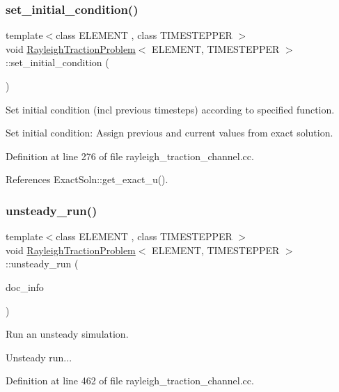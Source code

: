 \subsubsection{\texorpdfstring{set\+\_\+initial\+\_\+condition()}{set\_initial\_condition()}}
{\footnotesize\ttfamily template$<$class E\+L\+E\+M\+E\+NT , class T\+I\+M\+E\+S\+T\+E\+P\+P\+ER $>$ \\
void \hyperlink{classRayleighTractionProblem}{Rayleigh\+Traction\+Problem}$<$ E\+L\+E\+M\+E\+NT, T\+I\+M\+E\+S\+T\+E\+P\+P\+ER $>$\+::set\+\_\+initial\+\_\+condition (\begin{DoxyParamCaption}{ }\end{DoxyParamCaption})}



Set initial condition (incl previous timesteps) according to specified function. 

Set initial condition\+: Assign previous and current values from exact solution. 

Definition at line 276 of file rayleigh\+\_\+traction\+\_\+channel.\+cc.



References Exact\+Soln\+::get\+\_\+exact\+\_\+u().

\mbox{\label{classRayleighTractionProblem_a50871474406082ae1c1a1694e69e094b}} 
\subsubsection{\texorpdfstring{unsteady\+\_\+run()}{unsteady\_run()}}
{\footnotesize\ttfamily template$<$class E\+L\+E\+M\+E\+NT , class T\+I\+M\+E\+S\+T\+E\+P\+P\+ER $>$ \\
void \hyperlink{classRayleighTractionProblem}{Rayleigh\+Traction\+Problem}$<$ E\+L\+E\+M\+E\+NT, T\+I\+M\+E\+S\+T\+E\+P\+P\+ER $>$\+::unsteady\+\_\+run (\begin{DoxyParamCaption}\item[{Doc\+Info \&}]{doc\+\_\+info }\end{DoxyParamCaption})}



Run an unsteady simulation. 

Unsteady run... 

Definition at line 462 of file rayleigh\+\_\+traction\+\_\+channel.\+cc.



